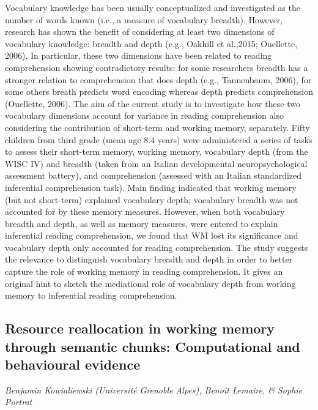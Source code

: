 \documentclass[
  12pt,
]{book}
\begin{document}
Vocabulary knowledge has been usually conceptualized and investigated as the number of words known (i.e., a measure of vocabulary breadth). However, research has shown the benefit of considering at least two dimensions of vocabulary knowledge: breadth and depth (e.g., Oakhill et al.,2015; Ouellette, 2006). In particular, these two dimensions have been related to reading comprehension showing contradictory results: for some researchers breadth has a stronger relation to comprehension that does depth (e.g., Tannenbaum, 2006), for some others breath predicts word encoding whereas depth predicts comprehension (Ouellette, 2006). The aim of the current study is to investigate how these two vocabulary dimensions account for variance in reading comprehension also considering the contribution of short-term and working memory, separately. Fifty children from third grade (mean age 8.4 years) were administered a series of tasks to assess their short-term memory, working memory, vocabulary depth (from the WISC IV) and breadth (taken from an Italian developmental neuropsychological assessment battery), and comprehension (assessed with an Italian standardized inferential comprehension task). Main finding indicated that working memory (but not short-term) explained vocabulary depth; vocabulary breadth was not accounted for by these memory measures. However, when both vocabulary breadth and depth, as well as memory measures, were entered to explain inferential reading comprehension, we found that WM lost its significance and vocabulary depth only accounted for reading comprehension. The study suggests the relevance to distinguish vocabulary breadth and depth in order to better capture the role of working memory in reading comprehension. It gives an original hint to sketch the mediational role of vocabulary depth from working memory to inferential reading comprehension.

\hypertarget{resource-reallocation-in-working-memory-through-semantic-chunks-computational-and-behavioural-evidence}{%
\subsection{Resource reallocation in working memory through semantic chunks: Computational and behavioural evidence}\label{resource-reallocation-in-working-memory-through-semantic-chunks-computational-and-behavioural-evidence}}

\emph{Benjamin Kowialiewski (Université Grenoble Alpes), Benoît Lemaire, \& Sophie Portrat}
\end{document}
